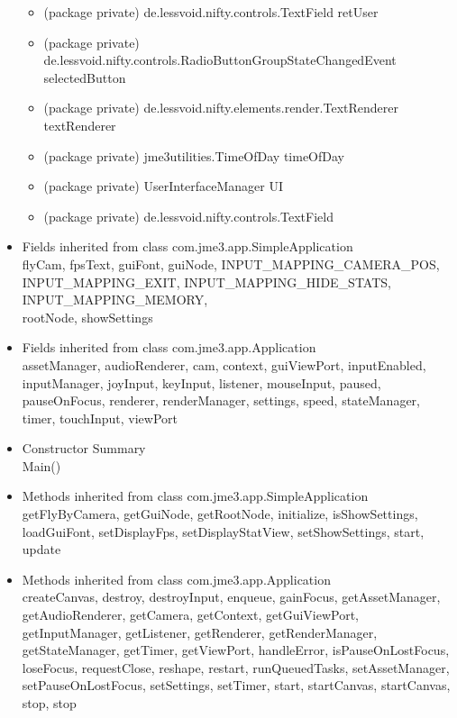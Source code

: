 \documentclass[letterpaper]{article}
\begin{document}
\begin{itemize}
\begin{itemize}
										\item	(package private) de.lessvoid.nifty.controls.TextField	retUser 
										\item	(package private) de.lessvoid.nifty.controls.RadioButtonGroupStateChangedEvent	selectedButton 
										\item	(package private) de.lessvoid.nifty.elements.render.TextRenderer	textRenderer 
										\item	(package private) jme3utilities.TimeOfDay	timeOfDay 
										\item	(package private) UserInterfaceManager	UI 
										\item	(package private) de.lessvoid.nifty.controls.TextField
									\end{itemize} 
							\item	Fields inherited from class com.jme3.app.SimpleApplication \\
									flyCam, fpsText, guiFont, guiNode, INPUT\_MAPPING\_CAMERA\_POS, \\ INPUT\_MAPPING\_EXIT, INPUT\_MAPPING\_HIDE\_STATS, INPUT\_MAPPING\_MEMORY, \\ rootNode, showSettings
							\item	Fields inherited from class com.jme3.app.Application \\
									assetManager, audioRenderer, cam, context, guiViewPort, inputEnabled, inputManager, joyInput, keyInput, listener, mouseInput, paused, pauseOnFocus, renderer, renderManager, settings, speed, stateManager, timer, touchInput, viewPort
							\item	Constructor Summary \\
									Main()
							\item	Methods inherited from class com.jme3.app.SimpleApplication \\
									getFlyByCamera, getGuiNode, getRootNode, initialize, isShowSettings, loadGuiFont, setDisplayFps, setDisplayStatView, setShowSettings, start, update
							\item	Methods inherited from class com.jme3.app.Application \\
									createCanvas, destroy, destroyInput, enqueue, gainFocus, getAssetManager, getAudioRenderer, getCamera, getContext, getGuiViewPort, getInputManager, getListener, getRenderer, getRenderManager, getStateManager, getTimer, getViewPort, handleError, isPauseOnLostFocus, loseFocus, requestClose, reshape, restart, runQueuedTasks, setAssetManager, setPauseOnLostFocus, setSettings, setTimer, start, startCanvas, startCanvas, stop, stop

\end{itemize}
\end{document}
